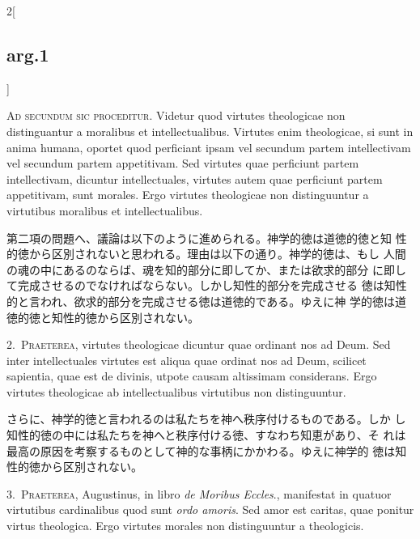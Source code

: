 \documentclass[paper=a4paper,fontsize=10pt,jafontsize=9pt,titlepage]{jlreq}
\begin{document}
\begin{paracol}{2}[\subsection{arg.1}]

{\scshape Ad secundum sic proceditur}. Videtur quod virtutes
theologicae non distinguantur a moralibus et
intellectualibus. Virtutes enim theologicae, si sunt in anima humana,
oportet quod perficiant ipsam vel secundum partem intellectivam vel
secundum partem appetitivam. Sed virtutes quae perficiunt partem
intellectivam, dicuntur intellectuales, virtutes autem quae perficiunt
partem appetitivam, sunt morales. Ergo virtutes theologicae non
distinguuntur a virtutibus moralibus et intellectualibus.

\switchcolumn

第二項の問題へ、議論は以下のように進められる。神学的徳は道徳的徳と知
 性的徳から区別されないと思われる。理由は以下の通り。神学的徳は、もし
 人間の魂の中にあるのならば、魂を知的部分に即してか、または欲求的部分
 に即して完成させるのでなければならない。しかし知性的部分を完成させる
 徳は知性的と言われ、欲求的部分を完成させる徳は道徳的である。ゆえに神
 学的徳は道徳的徳と知性的徳から区別されない。


2.~{\scshape Praeterea}, virtutes theologicae dicuntur quae ordinant
nos ad Deum. Sed inter intellectuales virtutes est aliqua quae ordinat
nos ad Deum, scilicet sapientia, quae est de divinis, utpote causam
altissimam considerans. Ergo virtutes theologicae ab intellectualibus
virtutibus non distinguuntur.

\switchcolumn

さらに、神学的徳と言われるのは私たちを神へ秩序付けるものである。しか
 し知性的徳の中には私たちを神へと秩序付ける徳、すなわち知恵があり、そ
 れは最高の原因を考察するものとして神的な事柄にかかわる。ゆえに神学的
 徳は知性的徳から区別されない。


3.~{\scshape Praeterea}, Augustinus, in libro {\itshape de Moribus
Eccles}., manifestat in quatuor virtutibus cardinalibus quod sunt
{\itshape ordo amoris}. Sed amor est caritas, quae ponitur virtus
theologica. Ergo virtutes morales non distinguuntur a theologicis.


\end{paracol}
\end{document}
